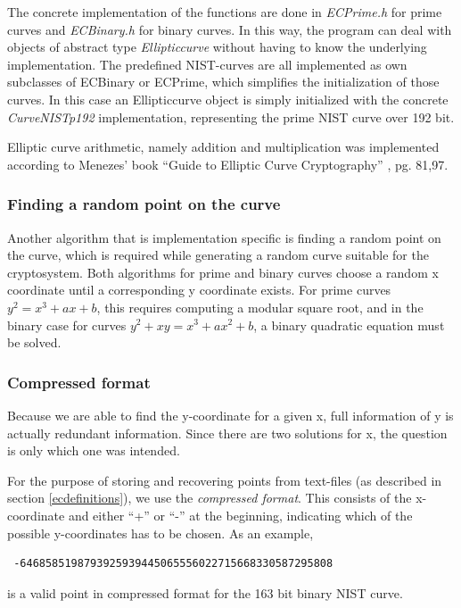 \documentclass[11pt,english]{article}
\begin{document}
The concrete implementation of the functions are done in \emph{ECPrime.h} for prime curves and \emph{ECBinary.h} for binary curves. In this way, the program can deal with objects of abstract type \emph{Ellipticcurve} without having to know the underlying implementation. The predefined NIST-curves are all implemented as own subclasses of ECBinary or ECPrime, which simplifies the initialization of those curves. In this case an Ellipticcurve object is simply initialized with the concrete \emph{CurveNISTp192} implementation, representing the prime NIST curve over 192 bit.

Elliptic curve arithmetic, namely addition and multiplication was implemented according to Menezes' book ``Guide to Elliptic Curve Cryptography'' \cite{940321}, pg. 81,97.

\subsubsection{Finding a random point on the curve}
\label{Finding a random point on the curve}
Another algorithm that is implementation specific is finding a random point on the curve, which is required while generating a random curve suitable for the cryptosystem. Both algorithms for prime and binary curves choose a random x coordinate until a corresponding y coordinate exists. For prime curves $y^2=x^3+ax+b$, this requires computing a modular square root, and in the binary case for curves $y^2+xy=x^3+ax^2+b$, a binary quadratic equation must be solved.

\subsubsection{Compressed format}
\label{Compressed format}
Because we are able to find the y-coordinate for a given x, full information of y is actually redundant information. Since there are two solutions for x, the question is only which one was intended.

For the purpose of storing and recovering points from text-files (as described in section \ref{ecdefinitions}), we use the \emph{compressed format}. This consists of the x-coordinate and either ``+'' or ``-'' at the beginning, indicating which of the possible y-coordinates has to be chosen. As an example,
\begin{verbatim}
 -6468585198793925939445065556022715668330587295808
\end{verbatim}
is a valid point in compressed format for the 163 bit binary NIST curve.
\end{document}
